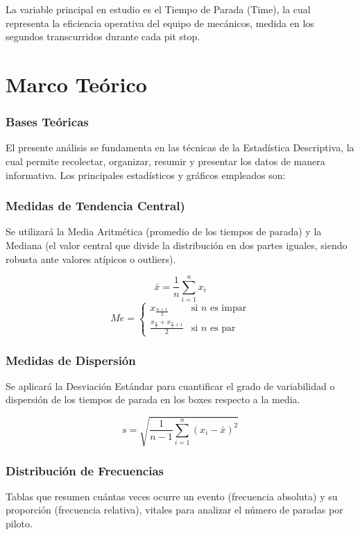 \documentclass[oneside,11pt]{Latex/Classes/PhDthesisPSnPDF}
\begin{document}
La variable principal en estudio es el Tiempo de Parada (Time), la cual
representa la eficiencia operativa del equipo de mecánicos, medida en
los segundos transcurridos durante cada pit stop.

\chapter{Marco Teórico}
\subsection{Bases Teóricas}

El presente análisis se fundamenta en las técnicas de la Estadística
Descriptiva, la cual permite recolectar, organizar, resumir y presentar
los datos de manera informativa. Los principales estadísticos y gráficos
empleados son:

\subsection{Medidas de Tendencia Central)}

Se utilizará la Media Aritmética (promedio de los tiempos de parada) y
la Mediana (el valor central que divide la distribución en dos partes
iguales, siendo robusta ante valores atípicos o outliers).

\[ \bar{x} = \frac{1}{n} \sum_{i=1}^{n} x_i \] \[ Me = \begin{cases} 
x_{\frac{n+1}{2}} & \text{si } n \text{ es impar} \\ 
\frac{x_{\frac{n}{2}} + x_{\frac{n}{2} + 1}}{2} & \text{si } n \text{ es par} 
\end{cases} \]

\subsection{Medidas de Dispersión}

Se aplicará la Desviación Estándar para cuantificar el grado de
variabilidad o dispersión de los tiempos de parada en los boxes respecto
a la media.

\[ s = \sqrt{\frac{1}{n-1} \sum_{i=1}^{n} (x_i - \bar{x})^2} \]

\subsection{Distribución de Frecuencias}

Tablas que resumen cuántas veces ocurre un evento (frecuencia absoluta)
y su proporción (frecuencia relativa), vitales para analizar el número
de paradas por piloto.
\end{document}
